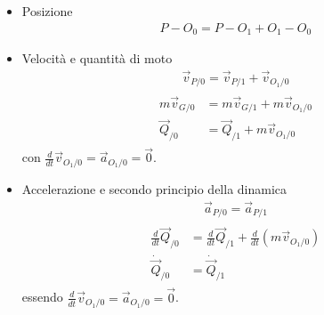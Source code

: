 \documentclass[letterpaper,10pt,italian]{jupyterBook}
\begin{document}
\sphinxAtStartPar
{}
\begin{itemize}
\item {} 
\sphinxAtStartPar
Posizione
\begin{equation*}
\begin{split}P - O_0 = P - O_1 + O_1 - O_0\end{split}
\end{equation*}
\item {} 
\sphinxAtStartPar
Velocità e quantità di moto
\begin{equation*}
\begin{split}\vec{v}_{P/0} = \vec{v}_{P/1} + \vec{v}_{O_1/0}\end{split}
\end{equation*}\begin{equation*}
\begin{split}\begin{aligned}
    m \vec{v}_{G/0} & = m \vec{v}_{G/1} + m \vec{v}_{O_1/0} \\
       \vec{Q}_{/0} & = \vec{Q}_{/1} + m \vec{v}_{O_1/0}
  \end{aligned}\end{split}
\end{equation*}
\sphinxAtStartPar
con \(\frac{d}{dt} \vec{v}_{O_1/0} = \vec{a}_{O_1/0} = \vec{0}\).

\item {} 
\sphinxAtStartPar
Accelerazione e secondo principio della dinamica
\begin{equation*}
\begin{split}\vec{a}_{P/0} = \vec{a}_{P/1}\end{split}
\end{equation*}\begin{equation*}
\begin{split}\begin{aligned}
    \frac{d}{dt} \vec{Q}_{/0} & = \frac{d}{dt} \vec{Q}_{/1} + \frac{d}{dt} \left( m \vec{v}_{O_1/0}\right) \\
    \dot{\vec{Q}}_{/0} & = \dot{\vec{Q}}_{/1}
  \end{aligned}\end{split}
\end{equation*}
\sphinxAtStartPar
essendo \(\frac{d}{dt} \vec{v}_{O_1/0} = \vec{a}_{O_1/0} = \vec{0}\).

\end{itemize}
\end{document}
